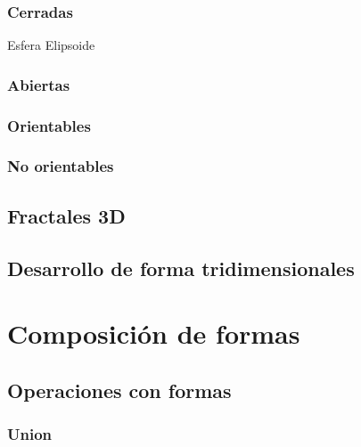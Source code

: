 \documentclass[
  16pt,
]{krantz}
\theoremstyle{definition}
\theoremstyle{definition}
\theoremstyle{definition}
\theoremstyle{definition}
\theoremstyle{remark}
\begin{document}
\hypertarget{cerradas}{%
\subsection{Cerradas}\label{cerradas}}

Esfera Elipsoide

\hypertarget{abiertas}{%
\subsection{Abiertas}\label{abiertas}}

\hypertarget{orientables}{%
\subsection{Orientables}\label{orientables}}

\hypertarget{no-orientables}{%
\subsection{No orientables}\label{no-orientables}}

\hypertarget{fractales-3d}{%
\section{Fractales 3D}\label{fractales-3d}}

\hypertarget{desarrollo-de-forma-tridimensionales}{%
\section{Desarrollo de forma tridimensionales}\label{desarrollo-de-forma-tridimensionales}}

\hypertarget{composiciuxf3n-de-formas}{%
\chapter{Composición de formas}\label{composiciuxf3n-de-formas}}

\hypertarget{operaciones-con-formas}{%
\section{Operaciones con formas}\label{operaciones-con-formas}}

\hypertarget{union}{%
\subsection{Union}\label{union}}
\end{document}
